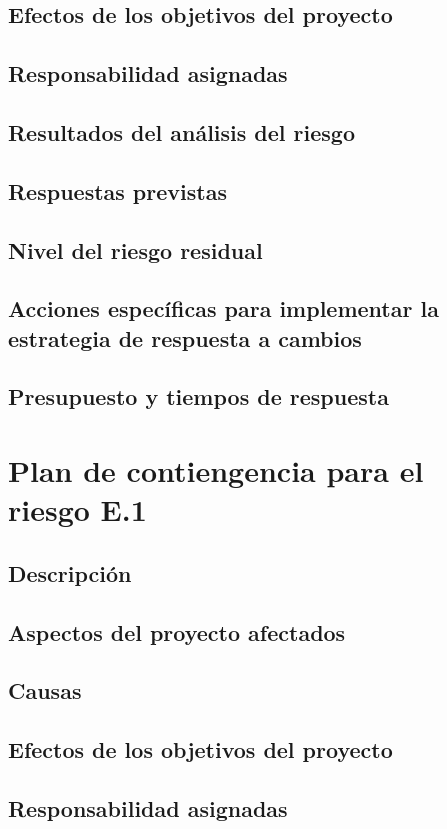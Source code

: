 \documentclass[11pt,a4paper,spanish,twoside]{report}
\begin{document}
\subsection{Efectos de los objetivos del proyecto}
\subsection{Responsabilidad asignadas}
\subsection{Resultados del análisis del riesgo}
\subsection{Respuestas previstas}
\subsection{Nivel del riesgo residual}
\subsection{Acciones específicas para implementar la estrategia de respuesta
a cambios}
\subsection{Presupuesto y tiempos de respuesta}

\section{Plan de contiengencia para el riesgo E.1}
\subsection{Descripción}
\subsection{Aspectos del proyecto afectados}
\subsection{Causas}
\subsection{Efectos de los objetivos del proyecto}
\subsection{Responsabilidad asignadas}
\end{document}
